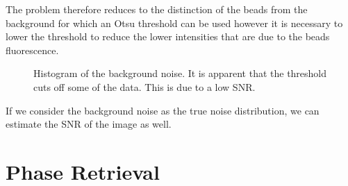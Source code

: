The problem therefore reduces to the distinction of the beads from the background for which an Otsu
    threshold can be used however it is necessary to lower the threshold to reduce the lower
    intensities that are due to the beads fluorescence.

\begin{figure}[h]
    \caption{Histogram of the background noise. It is apparent that the threshold cuts off some of the data. This is due
    to a low \ac{SNR}.}
\end{figure}

If we consider the background noise as the true noise distribution, we can estimate the \ac{SNR} of the image as well.




%
%
%

\section{Phase Retrieval}%

%
